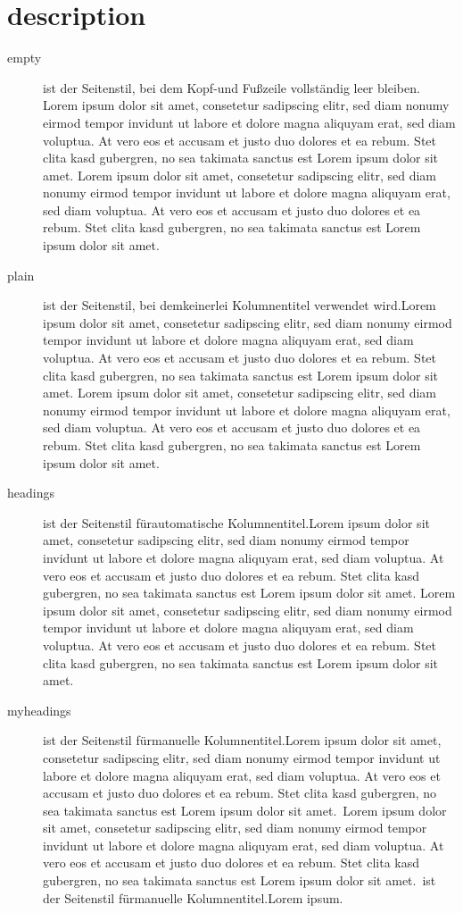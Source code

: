 \section{description}
\begin{description}
	\item[empty] ist der Seitenstil, bei dem Kopf-und Fußzeile vollständig leer bleiben. Lorem ipsum
	dolor sit amet, consetetur sadipscing elitr, sed diam nonumy eirmod tempor invidunt ut labore et dolore magna aliquyam erat, sed diam voluptua. At vero eos et accusam et justo duo dolores et ea rebum. Stet clita kasd gubergren, no sea takimata sanctus est Lorem ipsum dolor sit amet. Lorem ipsum dolor sit amet, consetetur sadipscing elitr, sed diam nonumy eirmod tempor invidunt ut labore et dolore magna aliquyam erat, sed diam voluptua. At vero eos et accusam et justo duo dolores et ea rebum. Stet clita kasd gubergren, no sea takimata sanctus est Lorem ipsum dolor sit amet.
	
	\item[plain] ist der Seitenstil, bei demkeinerlei Kolumnentitel verwendet wird.Lorem ipsum
	dolor sit amet, consetetur sadipscing elitr, sed diam nonumy eirmod tempor invidunt ut labore et dolore magna aliquyam erat, sed diam voluptua. At vero eos et accusam et justo duo dolores et ea rebum. Stet clita kasd gubergren, no sea takimata sanctus est Lorem ipsum dolor sit amet. Lorem ipsum dolor sit amet, consetetur sadipscing elitr, sed diam nonumy eirmod tempor invidunt ut labore et dolore magna aliquyam erat, sed diam voluptua. At vero eos et accusam et justo duo dolores et ea rebum. Stet clita kasd gubergren, no sea takimata sanctus est Lorem ipsum dolor sit amet.
	
	\item[headings] ist der Seitenstil fürautomatische Kolumnentitel.Lorem ipsum
	dolor sit amet, consetetur sadipscing elitr, sed diam nonumy eirmod tempor invidunt ut labore et dolore magna aliquyam erat, sed diam voluptua. At vero eos et accusam et justo duo dolores et ea rebum. Stet clita kasd gubergren, no sea takimata sanctus est Lorem ipsum dolor sit amet. Lorem ipsum dolor sit amet, consetetur sadipscing elitr, sed diam nonumy eirmod tempor invidunt ut labore et dolore magna aliquyam erat, sed diam voluptua. At vero eos et accusam et justo duo dolores et ea rebum. Stet clita kasd gubergren, no sea takimata sanctus est Lorem ipsum dolor sit amet.
	
	\item[myheadings] ist der Seitenstil fürmanuelle Kolumnentitel.Lorem ipsum 
	dolor sit amet, consetetur sadipscing elitr, sed diam nonumy eirmod tempor invidunt ut labore et dolore magna aliquyam erat, sed diam voluptua. At vero eos et accusam et justo duo dolores et ea rebum. Stet clita kasd gubergren, no sea takimata sanctus est Lorem ipsum dolor sit amet.\ Lorem ipsum dolor sit amet, consetetur sadipscing elitr, sed diam nonumy eirmod tempor invidunt ut labore et dolore magna aliquyam erat, sed diam voluptua. At vero eos et accusam et justo duo dolores et ea rebum. Stet clita kasd gubergren, no sea takimata sanctus est Lorem ipsum dolor sit amet.\ ist der Seitenstil fürmanuelle Kolumnentitel.Lorem ipsum.
\end{description}

